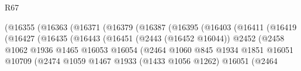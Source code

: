 \begin{lexlean}{R67}
\begin{coremodule}
                                            (@16355
                                              (@16363
                                                (@16371
                                                  (@16379
                                                    (@16387
                                                      (@16395
                                                        (@16403
                                                          (@16411
                                                            (@16419
                                                              (@16427
                                                                (@16435
                                                                  (@16443
                                                                    (@16451
                                                                      (@2443 (@16452 @16044))
                                                                      @2452
                                                                      (@2458
                                                                        @1062
                                                                        @1936
                                                                        @1465
                                                                        @16053
                                                                        @16054
                                                                        (@2464
                                                                          @1060
                                                                          @845
                                                                          @1934
                                                                          @1851
                                                                          @16051
                                                                          @10709
                                                                          (@2474
                                                                            @1059
                                                                            @1467
                                                                            @1933
                                                                            (@1433 @1056 @1262)
                                                                            @16051
                                                                            (@2464

\end{coremodule}
\end{lexlean}

